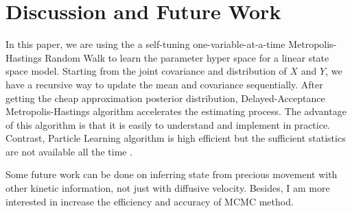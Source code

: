 \section{Discussion and Future Work}

In this paper, we are using the a self-tuning one-variable-at-a-time Metropolis-Hastings Random Walk to learn the parameter hyper space for a linear state space model.  Starting from the joint covariance and distribution of $X$ and $Y$, we have a recursive way to update the mean and covariance sequentially. After getting the cheap approximation posterior distribution, Delayed-Acceptance Metropolis-Hastings algorithm accelerates the estimating process.  The advantage of this algorithm is that it is easily to understand and implement in practice. Contrast, Particle Learning algorithm is high efficient but the sufficient statistics are not available all the time . 

Some future work can be done on inferring state from precious movement with other kinetic information, not just with diffusive  velocity. Besides, I am more interested in increase the efficiency and accuracy of MCMC method. 


\clearpage



